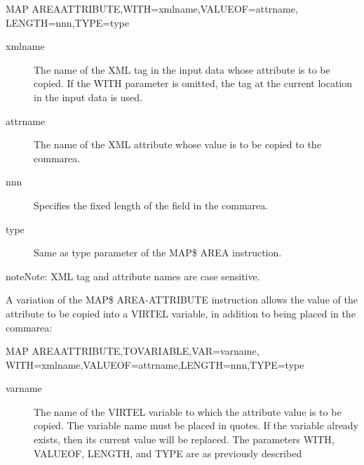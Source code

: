 \documentclass[letterpaper,10pt,english]{sphinxmanual}
\begin{document}
\begin{sphinxVerbatim}[commandchars=\\\{\}]
MAP\PYGZdl{} AREA\PYGZhy{}ATTRIBUTE,WITH=\PYGZsq{}xmlname\PYGZsq{},VALUEOF=\PYGZsq{}attrname\PYGZsq{},
    LENGTH=nnn,TYPE=type
\end{sphinxVerbatim}
\begin{description}
\item[{xmlname}] \leavevmode
The name of the XML tag in the input data whose attribute is to be copied. If the WITH parameter is omitted, the tag at the current location in the input data is used.

\item[{attrname}] \leavevmode
The name of the XML attribute whose value is to be copied to the commarea.

\item[{nnn}] \leavevmode
Specifies the fixed length of the field in the commarea.

\item[{type}] \leavevmode
Same as type parameter of the MAP\$ AREA instruction.

\end{description}

\begin{sphinxadmonition}{note}{Note:}
XML tag and attribute names are case sensitive.
\end{sphinxadmonition}

A variation of the MAP\$ AREA-ATTRIBUTE instruction allows the value of the attribute to be copied into a VIRTEL variable, in addition to being placed in the commarea:

\begin{sphinxVerbatim}[commandchars=\\\{\}]
MAP\PYGZdl{} AREA\PYGZhy{}ATTRIBUTE,TO\PYGZhy{}VARIABLE,VAR=\PYGZsq{}varname\PYGZsq{},
    WITH=\PYGZsq{}xmlname\PYGZsq{},VALUEOF=\PYGZsq{}attrname\PYGZsq{},LENGTH=nnn,TYPE=type
\end{sphinxVerbatim}
\begin{description}
\item[{varname}] \leavevmode
The name of the VIRTEL variable to which the attribute value is to be copied. The variable name must be placed in quotes. If the variable already exists, then its current value will be replaced. The parameters WITH, VALUEOF, LENGTH, and TYPE are as previously described

\end{description}
\end{document}
